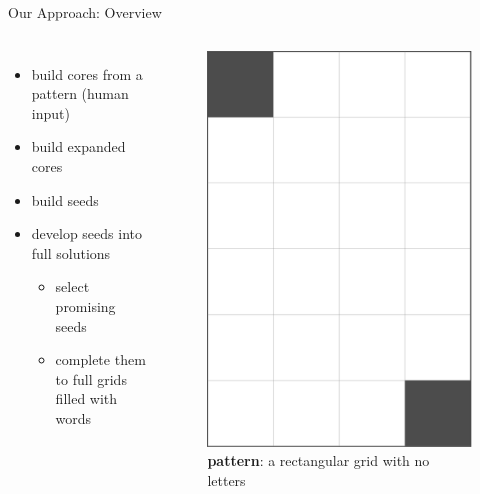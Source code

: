 \documentclass[aspectratio=169,usenames,dvipsnames]{beamer}
\newcommand{\bei}{\begin{itemize}}
\newcommand{\eei}{\end{itemize}}
\newcommand{\ie}{\item}
\numberwithin{equation}{section}
\numberwithin{theorem}{section}
\numberwithin{lem}{section}
\numberwithin{df}{section}
\begin{document}
\begin{frame}{Our Approach: Overview}

\begin{columns}

\bei
\ie build cores from a pattern (human input)

\medskip

\ie build expanded cores

\medskip

\ie build seeds

\medskip

\ie develop seeds into full solutions
\bei
\ie select promising seeds 
\ie complete them to full grids filled with words
\eei
\eei


\begin{figure}
\includegraphics[width=0.7\columnwidth]{_plots/6x4-puzzle.png}
\vspace{-0.25cm}
\caption{{\bf pattern}: a rectangular grid with no letters}
\end{figure}

\end{columns}

\end{frame}
\end{document}
